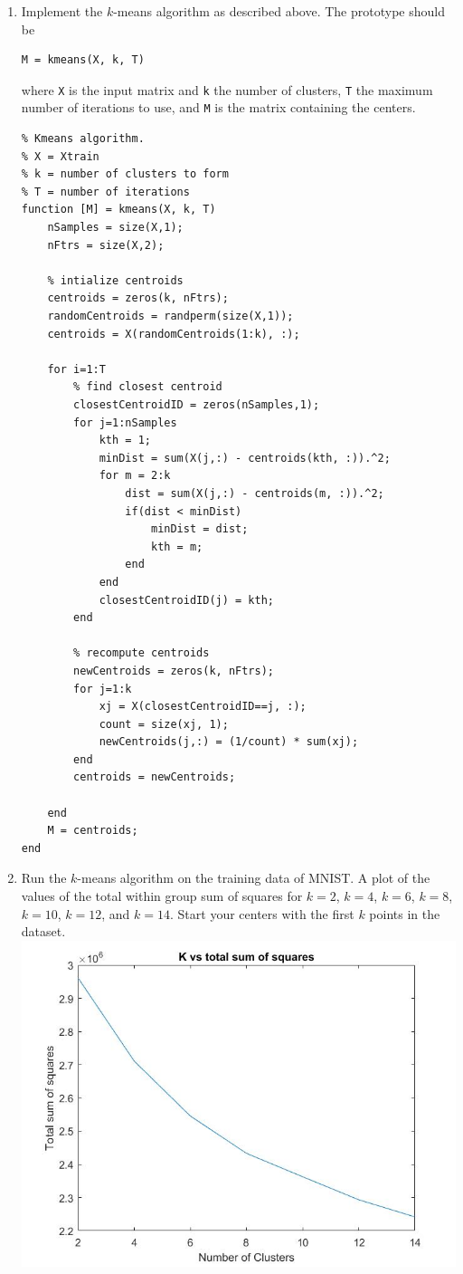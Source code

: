 \documentclass{article}
\begin{document}
\begin{enumerate}[label=(\alph*)]
\item Implement the $k$-means algorithm as described above. The prototype should be 
\begin{verbatim}
M = kmeans(X, k, T)
\end{verbatim}
where \texttt{X} is the input matrix and \texttt{k} the number of clusters, \texttt{T} the maximum number of iterations to use, and \texttt{M} is the matrix containing the centers.
\begin{verbatim}
% Kmeans algorithm.
% X = Xtrain
% k = number of clusters to form
% T = number of iterations
function [M] = kmeans(X, k, T)
    nSamples = size(X,1);
    nFtrs = size(X,2);
    
    % intialize centroids
    centroids = zeros(k, nFtrs);
    randomCentroids = randperm(size(X,1));
    centroids = X(randomCentroids(1:k), :);
    
    for i=1:T
        % find closest centroid
        closestCentroidID = zeros(nSamples,1);
        for j=1:nSamples
            kth = 1;
            minDist = sum(X(j,:) - centroids(kth, :)).^2;
            for m = 2:k
                dist = sum(X(j,:) - centroids(m, :)).^2;
                if(dist < minDist)
                    minDist = dist;
                    kth = m;
                end
            end
            closestCentroidID(j) = kth;
        end
        
        % recompute centroids
        newCentroids = zeros(k, nFtrs);
        for j=1:k
            xj = X(closestCentroidID==j, :);
            count = size(xj, 1);
            newCentroids(j,:) = (1/count) * sum(xj);    
        end
        centroids = newCentroids;
            
    end
    M = centroids;
end
\end{verbatim}

\item Run the $k$-means algorithm on the training data of MNIST. A plot of the values of the total within group sum of squares for $k = 2$, $k=4$, $k=6$, $k=8$, $k=10$, $k=12$, and $k=14$. Start your centers with the first $k$ points in the dataset.\\
\includegraphics[width=150mm,scale=0.5]{sum_square_3}


\end{enumerate}
\end{document}
